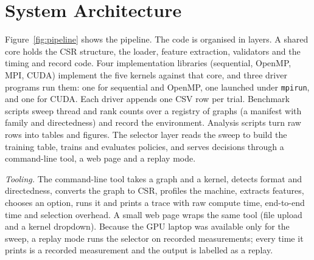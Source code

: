 \documentclass[conference]{IEEEtran}
\begin{document}
\section{System Architecture}
Figure~\ref{fig:pipeline} shows the pipeline. The code is organised in layers. A shared core holds the CSR structure, the loader, feature extraction, validators and the timing and record code. Four implementation libraries (sequential, OpenMP, MPI, CUDA) implement the five kernels against that core, and three driver programs run them: one for sequential and OpenMP, one launched under \texttt{mpirun}, and one for CUDA. Each driver appends one CSV row per trial. Benchmark scripts sweep thread and rank counts over a registry of graphs (a manifest with family and directedness) and record the environment. Analysis scripts turn raw rows into tables and figures. The selector layer reads the sweep to build the training table, trains and evaluates policies, and serves decisions through a command-line tool, a web page and a replay mode.

\textit{Tooling.} The command-line tool takes a graph and a kernel, detects format and directedness, converts the graph to CSR, profiles the machine, extracts features, chooses an option, runs it and prints a trace with raw compute time, end-to-end time and selection overhead. A small web page wraps the same tool (file upload and a kernel dropdown). Because the GPU laptop was available only for the sweep, a replay mode runs the selector on recorded measurements; every time it prints is a recorded measurement and the output is labelled as a replay.
\end{document}
